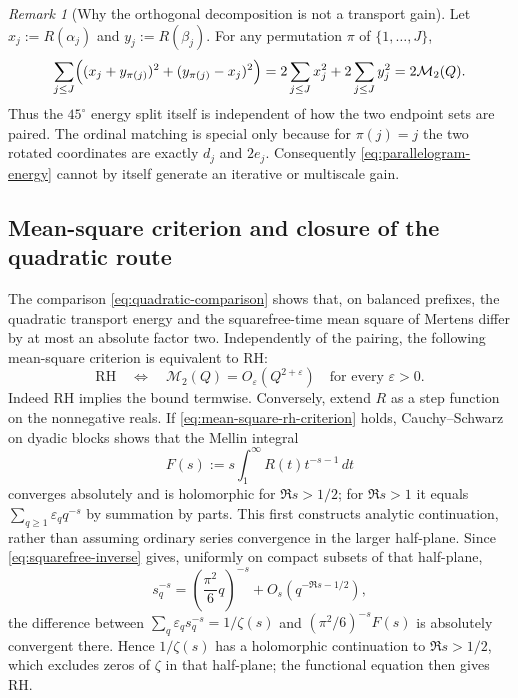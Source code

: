 \documentclass[11pt]{amsart}
\numberwithin{equation}{section}
\theoremstyle{plain}
\theoremstyle{definition}
\theoremstyle{remark}
\newtheorem{remark}[theorem]{Remark}
\begin{document}
\begin{remark}[Why the orthogonal decomposition is not a transport gain]
\label{rem:pairing-insensitive}
Let $x_j:=R(\alpha_j)$ and $y_j:=R(\beta_j)$.  For any permutation $\pi$ of
$\{1,\ldots,J\}$,
\begin{equation}
\label{eq:permutation-parallelogram}
\sum_{j\le J}\Bigl((x_j+y_{\pi(j)})^2+(y_{\pi(j)}-x_j)^2\Bigr)
=2\sum_{j\le J}x_j^2+2\sum_{j\le J}y_j^2
=2\mathcal M_2(Q).
\end{equation}
Thus the $45^\circ$ energy split itself is independent of how the two endpoint
sets are paired.  The ordinal matching is special only because for $\pi(j)=j$
the two rotated coordinates are exactly $d_j$ and $2e_j$.  Consequently
\eqref{eq:parallelogram-energy} cannot by itself generate an iterative or
multiscale gain.
\end{remark}

\subsection{Mean-square criterion and closure of the quadratic route}
\label{subsec:quadratic-closure}

The comparison \eqref{eq:quadratic-comparison} shows that, on balanced
prefixes, the quadratic transport energy and the squarefree-time mean square of
Mertens differ by at most an absolute factor two.  Independently of the
pairing, the following mean-square criterion is equivalent to RH:
\begin{equation}
\label{eq:mean-square-rh-criterion}
\mathrm{RH}
\quad\Longleftrightarrow\quad
\mathcal M_2(Q)=O_\varepsilon\!\left(Q^{2+\varepsilon}\right)
\quad\text{for every }\varepsilon>0.
\end{equation}
Indeed RH implies the bound termwise. Conversely, extend $R$ as a step function
on the nonnegative reals. If \eqref{eq:mean-square-rh-criterion} holds,
Cauchy--Schwarz on dyadic blocks shows that the Mellin integral
\begin{equation}
\label{eq:squarefree-sign-dirichlet}
F(s):=s\int_1^\infty R(t)t^{-s-1}\,dt
\end{equation}
converges absolutely and is holomorphic for $\Re s>1/2$; for $\Re s>1$ it equals
$\sum_{q\ge1}\varepsilon_q q^{-s}$ by summation by parts. This first constructs
analytic continuation, rather than assuming ordinary series convergence in
the larger half-plane. Since \eqref{eq:squarefree-inverse} gives, uniformly on compact
subsets of that half-plane,
\begin{equation}
\label{eq:squarefree-weight-comparison}
s_q^{-s}=\left(\frac{\pi^2}{6}q\right)^{-s}
+O_s\!\left(q^{-\Re s-1/2}\right),
\end{equation}
the difference between
$\sum_q\varepsilon_q s_q^{-s}=1/\zeta(s)$ and
$(\pi^2/6)^{-s}F(s)$ is absolutely convergent there.  Hence $1/\zeta(s)$ has a
holomorphic continuation to $\Re s>1/2$, which excludes zeros of $\zeta$ in
that half-plane; the functional equation then gives RH.
\end{document}
